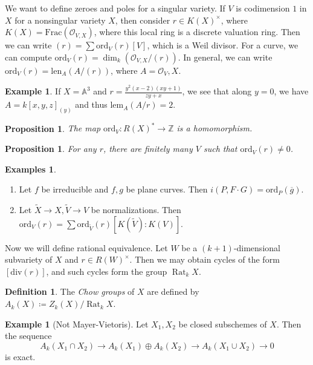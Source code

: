 \documentclass[leqno, openany]{memoir}
\newtheorem{prop}[thm]{Proposition}
\theoremstyle{definition}
\newtheorem{defn}[thm]{Definition}
\newtheorem{exm}[thm]{Example}
\newtheorem{exms}[thm]{Examples}
\theoremstyle{remark}
\theoremstyle{plain}
\theoremstyle{definition}
\theoremstyle{remark}
\newcommand{\A}{\mathbb{A}}
\newcommand{\Z}{\mathbb{Z}}
\newcommand{\mc}[1]{\mathcal{#1}}
\newcommand{\mr}[1]{\mathrm{#1}}
\newcommand{\ol}[1]{\overline{#1}}
\newcommand{\wt}[1]{\widetilde{#1}}
\begin{document}
We want to define zeroes and poles for a singular variety. If $V$ is
codimension $1$ in $X$ for a nonsingular variety $X$, then consider $r \in
{K(X)}^{\times}$, where $K(X) = \mr{Frac}(\mc{O}_{V,X})$, where this local ring
is a discrete valuation ring. Then we can write $(r) = \sum \mr{ord}_V(r) [V]$,
which is a Weil divisor. For a curve, we can compute $\mr{ord}_V(r) = \dim_k
(\mc{O}_{V,X} / (r))$. In general, we can write $\mr{ord}_V(r) =
\mr{len}_A(A/(r))$, where $A = \mc{O}_V,X$.

\begin{exm} If $X = \A^3$ and $r = \frac{y^2(x-2)(xy+1)}{zy+x}$, we see that
along $y = 0$, we have $A = { k[x,y,z] }_{(y)}$ and thus $\mr{lem}_A(A/r) = 2$.
\end{exm}

\begin{prop} The map $\mr{ord}_V \colon R(X)^* \to \Z$ is a homomorphism.
\end{prop}

\begin{prop} For any $r$, there are finitely many $V$ such that $\mr{ord}_V(r)
\neq 0$.  \end{prop}

\begin{exms}\leavevmode \begin{enumerate} \item Let $f$ be irreducible and
    $f,g$ be plane curves. Then $i(P, F \cdot G) = \mr{ord}_P(\ol{g})$.  \item
    Let $\wt{X} \to X, \wt{V} \to V$ be normalizations. Then $\mr{ord}_V(r) =
    \sum \mr{ord}_{\wt{V}}(r) [K(\wt{V}) : K(V)]$.  \end{enumerate} \end{exms}

Now we will define rational equivalence. Let $W$ be a $(k+1)$-dimensional
subvariety of $X$ and $r \in { R(W) }^{\times}$. Then we may obtain cycles of
the form $[\mr{div}(r)]$, and such cycles form the group $\operatorname{Rat}_k
X$.

\begin{defn} The \textit{Chow groups} of $X$ are defined by $A_k(X) \coloneqq
Z_k(X) / \operatorname{Rat}_k X$.  \end{defn}

\begin{exm}[Not Mayer-Vietoris] Let $X_1, X_2$ be closed subschemes of $X$.
    Then the sequence \[ A_k(X_1 \cap X_2) \to A_k(X_1) \oplus A_k(X_2) \to
    A_k(X_1 \cup X_2) \to 0 \] is exact.  \end{exm}
\end{document}

